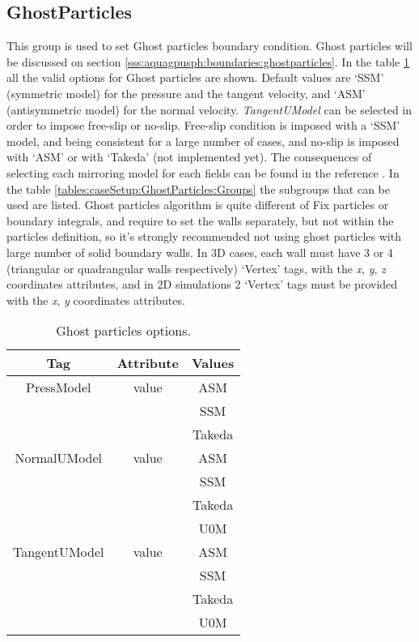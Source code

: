 \subsection{GhostParticles}
\label{sss:XML:GhostParticles}
%
This group is used to set Ghost particles boundary condition. Ghost particles
will be discussed on section \ref{sss:aquagpusph:boundaries:ghostparticles}.\rc
%
In the table \ref{tables:caseSetup:GhostParticles:Options} all the valid options
for Ghost particles are shown. Default values are `SSM' (symmetric model) for the
pressure and the tangent velocity, and `ASM' (antisymmetric model) for the normal
velocity.\rc
%
\textit{TangentUModel} can be selected in order to impose free-slip or no-slip.
Free-slip condition is imposed with a `SSM' model, and being consistent for a
large number of cases, and no-slip is imposed with `ASM' or with `Takeda' (not
implemented yet).\rc
%
The consequences of selecting each mirroring model for each fields can be found
in the reference \citep{MaciaetalPTP}.\rc
%
In the table \ref{tables:caseSetup:GhostParticles:Groups} the subgroups that can
be used are listed. Ghost particles algorithm is quite different of Fix particles
or boundary integrals, and require to set the walls separately, but not within the
particles definition, so it's strongly recommended not using ghost particles with
large number of solid boundary walls.\rc
%
In 3D cases, each wall must have 3 or 4 (triangular or quadrangular walls
respectively) `Vertex' tags, with the \textit{x}, \textit{y}, \textit{z} coordinates
attributes, and in 2D simulations 2 `Vertex' tags must be provided with the
\textit{x}, \textit{y} coordinates attributes.
%
\begin{table}[h!b!p!]\small
	\centering
	\begin{tabular}{| c | c | c | }
		\hline
		\cellcolor[rgb]{0.7,0.7,0.7}Tag & \cellcolor[rgb]{0.7,0.7,0.7}Attribute & \cellcolor[rgb]{0.7,0.7,0.7}Values \\
		\hline
		PressModel    & value & ASM \\
		\hline
		              &       & SSM \\
		\hline
		              &       & Takeda \\
		\hline
		NormalUModel  & value & ASM \\
		\hline
		              &       & SSM \\
		\hline
		              &       & Takeda \\
		\hline
		              &       & U0M \\
		\hline
		TangentUModel & value & ASM \\
		\hline
		              &       & SSM \\
		\hline
		              &       & Takeda \\
		\hline
		              &       & U0M \\
		\hline
	\end{tabular}
	\caption{Ghost particles options.}
	\label{tables:caseSetup:GhostParticles:Options}
\end{table}
